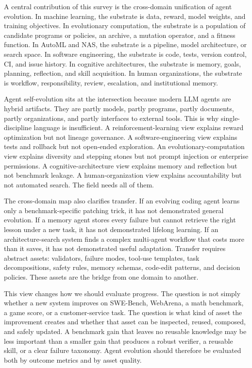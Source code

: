 A central contribution of this survey is the cross-domain unification of agent evolution. In machine learning, the substrate is data, reward, model weights, and training objectives. In evolutionary computation, the substrate is a population of candidate programs or policies, an archive, a mutation operator, and a fitness function. In AutoML and NAS, the substrate is a pipeline, model architecture, or search space. In software engineering, the substrate is code, tests, version control, CI, and issue history. In cognitive architectures, the substrate is memory, goals, planning, reflection, and skill acquisition. In human organizations, the substrate is workflow, responsibility, review, escalation, and institutional memory.

Agent self-evolution sits at the intersection because modern LLM agents are hybrid artifacts. They are partly models, partly programs, partly documents, partly organizations, and partly interfaces to external tools. This is why single-discipline language is insufficient. A reinforcement-learning view explains reward optimization but not lineage governance. A software-engineering view explains tests and rollback but not open-ended exploration. An evolutionary-computation view explains diversity and stepping stones but not prompt injection or enterprise permissions. A cognitive-architecture view explains memory and reflection but not benchmark leakage. A human-organization view explains accountability but not automated search. The field needs all of them.

The cross-domain map also clarifies transfer. If an evolving coding agent learns only a benchmark-specific patching trick, it has not demonstrated general evolution. If a memory agent stores every failure but cannot retrieve the right lesson under a new task, it has not demonstrated lifelong learning. If an architecture-search system finds a complex multi-agent workflow that costs more than it saves, it has not demonstrated useful adaptation. Transfer requires abstract assets: validators, failure modes, tool-use templates, task decompositions, safety rules, memory schemas, code-edit patterns, and decision policies. These assets are the bridge from one domain to another.

This view changes how we should evaluate progress. The question is not simply whether a new system improves on SWE-Bench, WebArena, a math benchmark, a game score, or a customer-service task. The question is what kind of asset the improvement creates and whether that asset can be inspected, reused, composed, and safely updated. A benchmark gain that leaves no reusable knowledge may be less important than a smaller gain that produces a robust verifier, a reusable skill, or a clear failure taxonomy. Agent evolution should therefore be evaluated both by outcome metrics and by asset quality.

